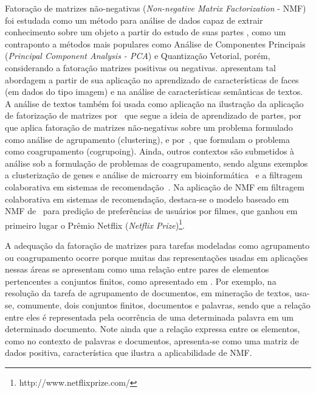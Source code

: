 \documentclass[
    12pt,                %
    oneside,            %
    a4paper,            %
    english,            %
    brazil                %
    ]{abntex2ppgsi}
\begin{document}
Fatoração de matrizes não-negativas (\textit{Non-negative Matrix Factorization} - NMF) foi estudada como um método para análise de dados capaz de extrair conhecimento sobre um objeto a partir do estudo de suas partes \cite{lee99}, como um contraponto a métodos mais populares como Análise de Componentes Principais (\textit{Principal Component Analysis - PCA}) e Quantização Vetorial, porém, considerando a fatoração matrizes positivas ou negativas.
 apresentam tal abordagem a partir de sua aplicação no aprendizado de características de faces (em dados do tipo imagem) e na análise de características semânticas de textos.
A análise de textos também foi usada como aplicação na ilustração da aplicação de fatorização de matrizes por~ que segue a ideia de aprendizado de partes, por  que aplica fatoração de matrizes não-negativas sobre um problema formulado como análise de agrupamento (clustering), e por~, que formulam o problema como coagrupamento (cogrupoing).
Ainda, outros contextos são submetidos à análise sob a formulação de problemas de coagrupamento, sendo alguns exemplos a clusterização de genes e análise de microarry em bioinformática~\cite{Kluger2003} e a filtragem colaborativa em sistemas de recomendação~\cite{SalMnih08}.
Na aplicação de NMF em filtragem colaborativa em sistemas de recomendação, destaca-se o modelo baseado em NMF de~ para predição de preferências de usuários por filmes, que ganhou em primeiro lugar o Prêmio Netflix (\textit{Netflix Prize})\footnote{http://www.netflixprize.com/}.

A adequação da fatoração de matrizes para tarefas modeladas como agrupamento ou coagrupamento ocorre porque muitas das representações usadas em aplicações nessas áreas se apresentam como uma relação entre pares de elementos pertencentes a conjuntos finitos, como apresentado em \cite{Long2005}. Por exemplo, na resolução da tarefa de agrupamento de documentos, em mineração de textos, usa-se, comumente, dois conjuntos finitos, documentos e palavras, sendo que a relação entre eles é representada pela ocorrência de uma determinada palavra em um determinado documento. Note ainda que a relação expressa entre os elementos, como no contexto de palavras e documentos, apresenta-se como uma matriz de dados positiva, característica que ilustra a aplicabilidade de NMF.
\end{document}
